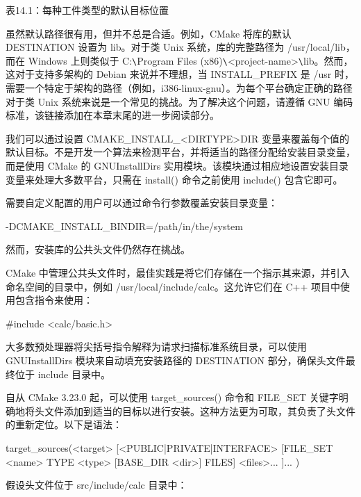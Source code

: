 \begin{center}
表14.1：每种工件类型的默认目标位置
\end{center}

虽然默认路径很有用，但并不总是合适。例如，CMake 将库的默认 DESTINATION 设置为 lib。对于类 Unix 系统，库的完整路径为 /usr/local/lib，而在 Windows 上则类似于 C:\verb|\|Program Files (x86)\verb|\|<project-name>\verb|\|lib。然而，这对于支持多架构的 Debian 来说并不理想，当 INSTALL\_PREFIX 是 /usr 时，需要一个特定于架构的路径（例如，i386-linux-gnu）。为每个平台确定正确的路径对于类 Unix 系统来说是一个常见的挑战。为了解决这个问题，请遵循 GNU 编码标准，该链接添加在本章末尾的进一步阅读部分。

我们可以通过设置 CMAKE\_INSTALL\_<DIRTYPE>DIR 变量来覆盖每个值的默认目标。不是开发一个算法来检测平台，并将适当的路径分配给安装目录变量，而是使用 CMake 的 GNUInstallDirs 实用模块。该模块通过相应地设置安装目录变量来处理大多数平台，只需在 install() 命令之前使用 include() 包含它即可。

需要自定义配置的用户可以通过命令行参数覆盖安装目录变量：

\begin{shell}
-DCMAKE_INSTALL_BINDIR=/path/in/the/system
\end{shell}

然而，安装库的公共头文件仍然存在挑战。


CMake 中管理公共头文件时，最佳实践是将它们存储在一个指示其来源，并引入命名空间的目录中，例如 /usr/local/include/calc。这允许它们在 C++ 项目中使用包含指令来使用：

\begin{cpp}
#include <calc/basic.h>
\end{cpp}

大多数预处理器将尖括号指令解释为请求扫描标准系统目录，可以使用 GNUInstallDirs 模块来自动填充安装路径的 DESTINATION 部分，确保头文件最终位于 include 目录中。

自从 CMake 3.23.0 起，可以使用 target\_sources() 命令和 FILE\_SET 关键字明确地将头文件添加到适当的目标以进行安装。这种方法更为可取，其负责了头文件的重新定位。以下是语法：

\begin{shell}
target_sources(<target>
    [<PUBLIC|PRIVATE|INTERFACE>
        [FILE_SET <name> TYPE <type> [BASE_DIR <dir>] FILES]
        <files>...
    ]...
)
\end{shell}

假设头文件位于 src/include/calc 目录中：

